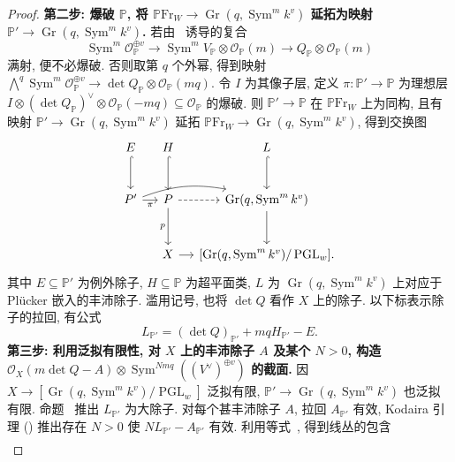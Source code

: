 \begin{proof}
\textbf{第二步: 爆破 $\mathbb P$, 将 $\mathbb P\mathrm{Fr}_W\to\operatorname{Gr}(q,\allowbreak \operatorname{Sym}^mk^v)$ 延拓为映射 $\mathbb P'\to\operatorname{Gr}(q,\allowbreak \operatorname{Sym}^mk^v)$.} 若由~ 诱导的复合
\[
\operatorname{Sym}^m\mathcal O_{\mathbb P}^{\oplus v}\longrightarrow\operatorname{Sym}^mV_{\mathbb P}\otimes\mathcal O_{\mathbb P}(m)\longrightarrow Q_{\mathbb P}\otimes\mathcal O_{\mathbb P}(m)
\]
满射, 便不必爆破. 否则取第 $q$ 个外幂, 得到映射 $\bigwedge^q\operatorname{Sym}^m\mathcal O_{\mathbb P}^{\oplus v}\to\det Q_{\mathbb P}\otimes\mathcal O_{\mathbb P}(mq)$. 令 $I$ 为其像子层, 定义 $\pi:\mathbb P'\to\mathbb P$ 为理想层 $I\otimes(\det Q_{\mathbb P})^\vee\otimes\mathcal O_{\mathbb P}(-mq)\subseteq\mathcal O_{\mathbb P}$ 的爆破. 则 $\mathbb P'\to\mathbb P$ 在 $\mathbb P\mathrm{Fr}_W$ 上为同构, 且有映射 $\mathbb P'\to\operatorname{Gr}(q,\allowbreak \operatorname{Sym}^mk^v)$ 延拓 $\mathbb P\mathrm{Fr}_W\to\operatorname{Gr}(q,\allowbreak \operatorname{Sym}^mk^v)$, 得到交换图
\[
\begin{tikzcd}[column sep=small,row sep=large]
E\arrow[d,hook]&H\arrow[d,hook]&L\arrow[d,hook]\\
\mathbb P'\arrow[r,"\pi"']\arrow[rr,bend left=15]&\mathbb P\arrow[r,dashed]\arrow[d,"p"']&\operatorname{Gr}(q,\operatorname{Sym}^mk^v)\arrow[d]\\
&X\arrow[r]&{[\operatorname{Gr}(q,\operatorname{Sym}^mk^v)/\operatorname{PGL}_w]}.
\end{tikzcd}
\]
其中 $E\subseteq\mathbb P'$ 为例外除子, $H\subseteq\mathbb P$ 为超平面类, $L$ 为 $\operatorname{Gr}(q,\allowbreak \operatorname{Sym}^mk^v)$ 上对应于 Plücker 嵌入的丰沛除子. 滥用记号, 也将 $\det Q$ 看作 $X$ 上的除子. 以下标表示除子的拉回, 有公式
\begin{equation}\label{src:6.9.17}
L_{\mathbb P'}=(\det Q)_{\mathbb P'}+mqH_{\mathbb P'}-E.
\end{equation}
\textbf{第三步: 利用泛拟有限性, 对 $X$ 上的丰沛除子 $A$ 及某个 $N>0$, 构造 $\mathcal O_X(m\det Q-A)\otimes\operatorname{Sym}^{Nmq}((V^\vee)^{\oplus v})$ 的截面.} 因 $X\to[\operatorname{Gr}(q,\allowbreak \operatorname{Sym}^mk^v)/\operatorname{PGL}_w]$ 泛拟有限, $\mathbb P'\to\operatorname{Gr}(q,\allowbreak \operatorname{Sym}^mk^v)$ 也泛拟有限. 命题~ 推出 $L_{\mathbb P'}$ 为大除子. 对每个甚丰沛除子 $A$, 拉回 $A_{\mathbb P'}$ 有效, Kodaira 引理 () 推出存在 $N>0$ 使 $NL_{\mathbb P'}-A_{\mathbb P'}$ 有效. 利用等式~, 得到线丛的包含
\[
\begin{aligned}

\end{aligned}\]
\end{proof}
